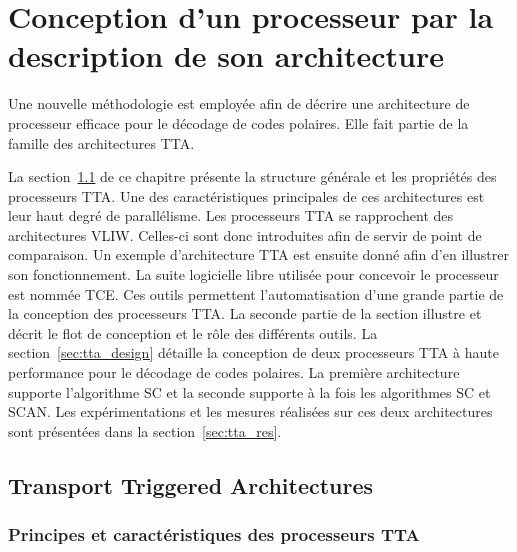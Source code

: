 \chapter{Conception d'un processeur par la description de son architecture} %
\label{chap:tta}

Une nouvelle méthodologie est employée afin de décrire une architecture de processeur efficace pour le décodage de codes polaires. Elle fait partie de la famille des architectures TTA.

La section~\ref{sec:tta_description} de ce chapitre présente la structure générale et les propriétés des processeurs TTA. Une des caractéristiques principales de ces architectures est leur haut degré de parallélisme. Les processeurs TTA se rapprochent des architectures VLIW. Celles-ci sont donc introduites afin de servir de point de comparaison. Un exemple d'architecture TTA est ensuite donné afin d'en illustrer son fonctionnement. La suite logicielle libre utilisée pour concevoir le processeur est nommée TCE. Ces outils permettent l'automatisation d'une grande partie de la conception des processeurs TTA. La seconde partie de la section illustre et décrit le flot de conception et le rôle des différents outils. La section~\ref{sec:tta_design} détaille la conception de deux processeurs TTA à haute performance pour le décodage de codes polaires. La première architecture supporte l'algorithme SC et la seconde supporte à la fois les algorithmes SC et SCAN. Les expérimentations et les mesures réalisées sur ces deux architectures sont présentées dans la section~\ref{sec:tta_res}.

\vspace*{\fill}
\minitocTITI
\vspace*{\fill}
\newpage

\section{Transport Triggered Architectures}
\label{sec:tta_description}

\subsection{Principes et caractéristiques des processeurs TTA}

